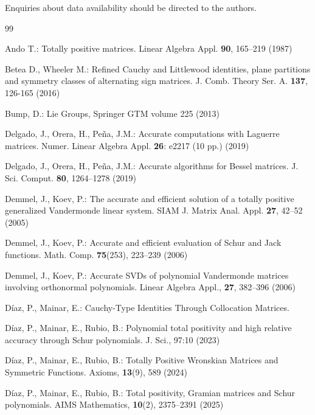 \documentclass[smallextended]{svjour3}       %
\begin{document}
  Enquiries about data availability should be directed to the authors.
  


 
\begin{thebibliography}{99}


  Ando T.: Totally positive matrices. Linear Algebra Appl. {\bf 90}, 165--219 (1987)

 Betea D., Wheeler M.: Refined Cauchy and Littlewood identities, plane partitions and symmetry classes of alternating sign matrices. J. Comb. Theory Ser. A. {\bf 137}, 126-165  (2016) 
 

  Bump, D.: Lie Groups, Springer GTM volume 225 (2013) %

 Delgado, J., Orera,  H.,  Pe\~na, J.M.: Accurate computations with Laguerre matrices. Numer. Linear Algebra Appl. {\bf 26}: e2217 (10 pp.) (2019)

 Delgado, J., Orera,  H.,  Pe\~na, J.M.:  Accurate algorithms for Bessel matrices. J. Sci. Comput. {\bf 80},  1264--1278 (2019)



  Demmel, J.,  Koev, P.: The accurate and efficient solution of a totally positive generalized Vandermonde linear system. SIAM J. Matrix Anal. Appl. {\bf 27}, 42--52 (2005)

   Demmel, J.,  Koev, P.: Accurate and efficient evaluation of Schur and Jack functions. Math. Comp. {\bf 75}(253), 223--239 (2006)

 Demmel, J.,  Koev, P.: Accurate SVDs of polynomial Vandermonde matrices involving orthonormal polynomials. Linear Algebra Appl., {\bf 27}, 382--396  (2006)

  Díaz, P., Mainar, E.: Cauchy-Type Identities Through Collocation Matrices. %

  Díaz, P., Mainar, E.,  Rubio, B.: Polynomial total positivity and high relative accuracy through Schur polynomials. J. Sci., 97:10  (2023)

  Díaz, P., Mainar, E.,  Rubio, B.: Totally Positive Wronskian Matrices and Symmetric Functions. Axioms, {\bf 13}(9), 589  (2024)

 Díaz, P., Mainar, E.,  Rubio, B.:   Total positivity, Gramian matrices and Schur polynomials. AIMS Mathematics, {\bf 10}(2), 2375–2391  (2025)


\end{thebibliography}
\end{document}

